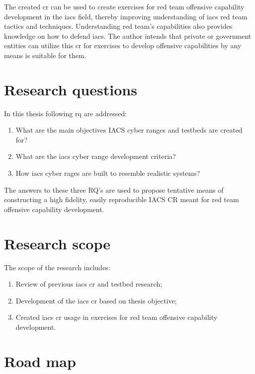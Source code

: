 The created \gls*{cr} can be used to create exercises for red team offensive capability development in the \gls*{iacs} field, thereby improving understanding of \gls*{iacs} red team tactics and techniques. Understanding red team's capabilities also provides knowledge on how to defend \gls*{iacs}. The author intends that private or government entities can utilize this \gls*{cr} for exercises to develop offensive capabilities by any means is suitable for them.


\section{Research questions}

In this thesis following \gls*{rq} are addressed:

\begin{enumerate}
	
	\item What are the main objectives IACS cyber ranges and testbeds are created for? \label{rq:1}
	
	\item  What are the \gls*{iacs} cyber range development criteria? \label{rq:2}
	
	\item How \gls*{iacs} cyber rages are built to resemble realistic systems? \label{rq:3}
\end{enumerate}

The answers to these three RQ's are used to propose tentative means of constructing a high fidelity, easily reproducible IACS CR meant for red team offensive capability development.

\section{Research scope}

The scope of the research includes: 
\begin{enumerate}
	\item Review of previous \gls*{iacs} \gls*{cr} and testbed research;
	\item Development of the \gls*{iacs} \gls*{cr} based on thesis objective;
	\item Created \gls*{iacs} \gls*{cr} usage in exercises for red team offensive capability development. 
\end{enumerate}


\section{Road map}


